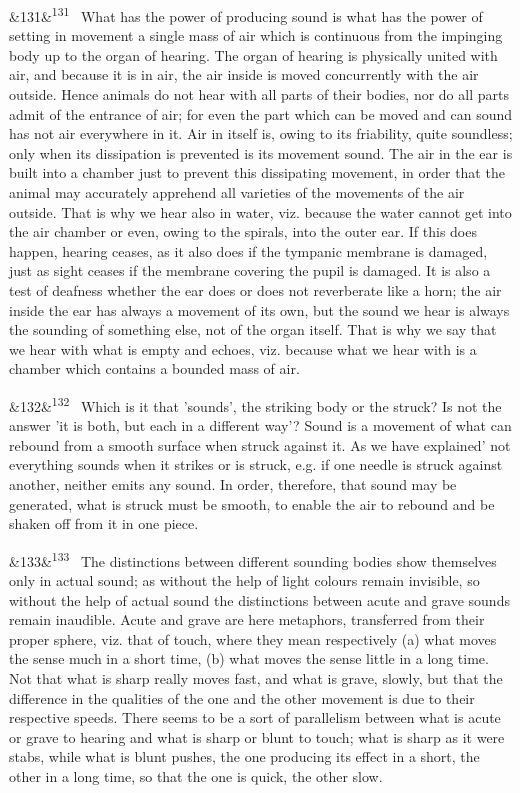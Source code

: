 \documentclass[12pt]{article}
\newcommand{\para}[1][]{\par\noindent\ifx&#1&\else\textsuperscript{\footnotesize #1}~\fi}
\begin{document}
\para[131] What has the power of producing sound is what has the power of setting in movement a single mass of air which is continuous from the impinging body up to the organ of hearing. The organ of hearing is physically united with air, and because it is in air, the air inside is moved concurrently with the air outside. Hence animals do not hear with all parts of their bodies, nor do all parts admit of the entrance of air; for even the part which can be moved and can sound has not air everywhere in it. Air in itself is, owing to its friability, quite soundless; only when its dissipation is prevented is its movement sound. The air in the ear is built into a chamber just to prevent this dissipating movement, in order that the animal may accurately apprehend all varieties of the movements of the air outside. That is why we hear also in water, viz. because the water cannot get into the air chamber or even, owing to the spirals, into the outer ear. If this does happen, hearing ceases, as it also does if the tympanic membrane is damaged, just as sight ceases if the membrane covering the pupil is damaged. It is also a test of deafness whether the ear does or does not reverberate like a horn; the air inside the ear has always a movement of its own, but the sound we hear is always the sounding of something else, not of the organ itself. That is why we say that we hear with what is empty and echoes, viz. because what we hear with is a chamber which contains a bounded mass of air.

\para[132] Which is it that 'sounds', the striking body or the struck? Is not the answer 'it is both, but each in a different way'? Sound is a movement of what can rebound from a smooth surface when struck against it. As we have explained' not everything sounds when it strikes or is struck, e.g. if one needle is struck against another, neither emits any sound. In order, therefore, that sound may be generated, what is struck must be smooth, to enable the air to rebound and be shaken off from it in one piece.

\para[133] The distinctions between different sounding bodies show themselves only in actual sound; as without the help of light colours remain invisible, so without the help of actual sound the distinctions between acute and grave sounds remain inaudible. Acute and grave are here metaphors, transferred from their proper sphere, viz. that of touch, where they mean respectively (a) what moves the sense much in a short time, (b) what moves the sense little in a long time. Not that what is sharp really moves fast, and what is grave, slowly, but that the difference in the qualities of the one and the other movement is due to their respective speeds. There seems to be a sort of parallelism between what is acute or grave to hearing and what is sharp or blunt to touch; what is sharp as it were stabs, while what is blunt pushes, the one producing its effect in a short, the other in a long time, so that the one is quick, the other slow.
\end{document}
